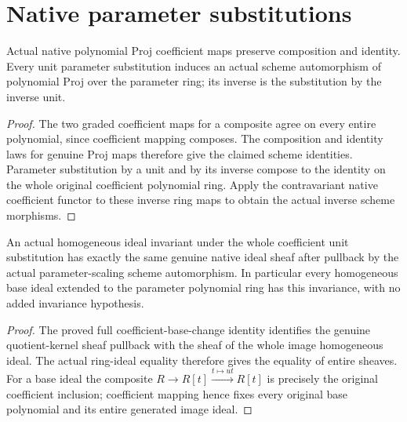 \section{Native parameter substitutions}

\begin{lemma}
\label{lem:native-parameter-unit-iso}
\leanok
Actual native polynomial Proj coefficient maps preserve composition and
identity.  Every unit parameter substitution induces an actual scheme
automorphism of polynomial Proj over the parameter ring; its inverse is
the substitution by the inverse unit.
\end{lemma}
\begin{proof}
The two graded coefficient maps for a composite agree on every entire
polynomial, since coefficient mapping composes.  The composition and
identity laws for genuine Proj maps therefore give the claimed scheme
identities.  Parameter substitution by a unit and by its inverse compose
to the identity on the whole original coefficient polynomial ring.
Apply the contravariant native coefficient functor to these inverse ring
maps to obtain the actual inverse scheme morphisms.
\end{proof}

\begin{lemma}
\label{lem:native-parameter-ideal-invariance}
\leanok
An actual homogeneous ideal invariant under the whole coefficient unit
substitution has exactly the same genuine native ideal sheaf after
pullback by the actual parameter-scaling scheme automorphism.
In particular every homogeneous base ideal extended to the parameter
polynomial ring has this invariance, with no added invariance hypothesis.
\end{lemma}
\begin{proof}
The proved full coefficient-base-change identity identifies
the genuine quotient-kernel sheaf pullback with the sheaf of the whole
image homogeneous ideal.  The actual ring-ideal equality therefore gives
the equality of entire sheaves.  For a base ideal the composite
$R\to R[t]\xrightarrow{t\mapsto ut}R[t]$ is precisely the original
coefficient inclusion; coefficient mapping hence fixes every original
base polynomial and its entire generated image ideal.
\end{proof}

